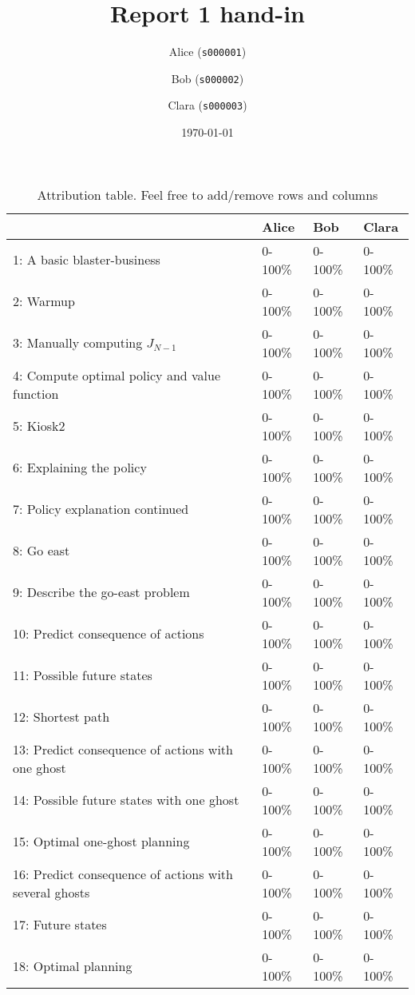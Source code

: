 \documentclass[12pt,twoside]{article}
\title{ Report 1 hand-in }
\date{ \today }
\author{Alice (\texttt{s000001})\and  Bob (\texttt{s000002})\and Clara (\texttt{s000003}) }
\begin{document}
\maketitle

\begin{table}[ht!]
\caption{Attribution table. Feel free to add/remove rows and columns}
\begin{tabular}{llll}
\toprule
                                                        & Alice   & Bob    & Clara   \\
\midrule
 1: A basic blaster-business                            & 0-100\%  & 0-100\% & 0-100\%  \\
 2: Warmup                                              & 0-100\%  & 0-100\% & 0-100\%  \\
 3: Manually computing $J_{N-1}$                        & 0-100\%  & 0-100\% & 0-100\%  \\
 4: Compute optimal policy and value function           & 0-100\%  & 0-100\% & 0-100\%  \\
 5: Kiosk2                                              & 0-100\%  & 0-100\% & 0-100\%  \\
 6: Explaining the policy                               & 0-100\%  & 0-100\% & 0-100\%  \\
 7: Policy explanation continued                        & 0-100\%  & 0-100\% & 0-100\%  \\
 8: Go east                                             & 0-100\%  & 0-100\% & 0-100\%  \\
 9: Describe the go-east problem                        & 0-100\%  & 0-100\% & 0-100\%  \\
 10: Predict consequence of actions                     & 0-100\%  & 0-100\% & 0-100\%  \\
 11: Possible future states                             & 0-100\%  & 0-100\% & 0-100\%  \\
 12: Shortest path                                      & 0-100\%  & 0-100\% & 0-100\%  \\
 13: Predict consequence of actions with one ghost      & 0-100\%  & 0-100\% & 0-100\%  \\
 14: Possible future states with one ghost              & 0-100\%  & 0-100\% & 0-100\%  \\
 15: Optimal one-ghost planning                         & 0-100\%  & 0-100\% & 0-100\%  \\
 16: Predict consequence of actions with several ghosts & 0-100\%  & 0-100\% & 0-100\%  \\
 17: Future states                                      & 0-100\%  & 0-100\% & 0-100\%  \\
 18: Optimal planning                                   & 0-100\%  & 0-100\% & 0-100\%  \\
\bottomrule
\end{tabular}
\end{table}
\end{document}
